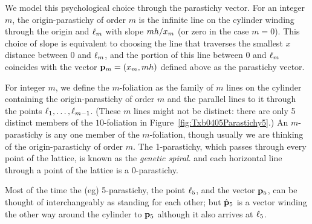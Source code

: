 

We model this psychological choice through the parastichy vector. For an integer $m$, the origin-parastichy of order $m$ is the infinite line on the cylinder winding through the origin and $\ell_{{m}}$ with slope $mh/x_m$ (or zero in the case $m=0$). This choice of slope is equivalent to choosing the line that traverses the smallest $x$ distance between $0$ and $\ell_{{m}}$, and the portion of this line between $0$ and $\ell_{{m}}$ coincides with the vector ${\mathbf p}_{m}=(x_m,mh)$ defined above as the parastichy vector.

For integer $m$, we define the $m$-foliation as  the family of  $m$ lines on the cylinder containing the origin-parastichy of order $m$ and the parallel lines to it through the points $\ell_{{1}},\ldots,\ell_{{m-1}}$. (These $m$ lines might not be distinct: there are only 5 distinct members of the $10$-foliation in Figure~\ref{fig:Txb0405Parastichy5}.)
An $m$-parastichy is any one member of the $m$-foliation, though usually we are thinking of the origin-parastichy of order $m$. 
The 1-parastichy, which passes through every point of the lattice, is known as the \emph{genetic spiral}. 
 and each horizontal line through a point of the lattice is a $0$-parastichy. 

Most of the time the (eg) 5-parastichy, the point $\ell_{{5}}$, and the vector ${\mathbf p}_{5}$,  can be thought of interchangeably as standing for each other; but $\hat{\mathbf p}_{5}$ is a  vector winding the other way around the cylinder to ${\mathbf p}_{5}$ although it also arrives at  $\ell_{{5}}$.
